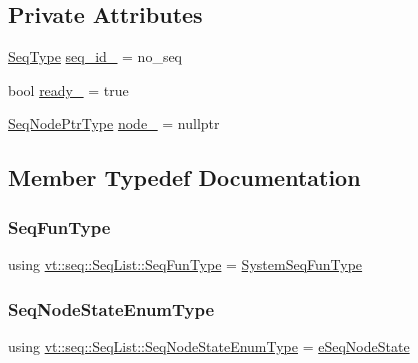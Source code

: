 \subsection*{Private Attributes}
\begin{DoxyCompactItemize}
\item 
\hyperlink{namespacevt_1_1seq_a3b612da217ac669d39c159f134ab8434}{Seq\+Type} \hyperlink{structvt_1_1seq_1_1_seq_list_abfbd1dc51e017e52745777f1c071b342}{seq\+\_\+id\+\_\+} = no\+\_\+seq
\item 
bool \hyperlink{structvt_1_1seq_1_1_seq_list_aeab1d1e13104f99fdf91eb57bc8f658a}{ready\+\_\+} = true
\item 
\hyperlink{namespacevt_1_1seq_ae6a4874b585be0612aaca32ca6d2d191}{Seq\+Node\+Ptr\+Type} \hyperlink{structvt_1_1seq_1_1_seq_list_afdf8a98af5cb6fbd49da10375a565a87}{node\+\_\+} = nullptr
\end{DoxyCompactItemize}


\subsection{Member Typedef Documentation}
\mbox{\label{structvt_1_1seq_1_1_seq_list_afa5aacad3530e543d1ea016acbfb1cbb}} 
\subsubsection{\texorpdfstring{Seq\+Fun\+Type}{SeqFunType}}
{\footnotesize\ttfamily using \hyperlink{structvt_1_1seq_1_1_seq_list_afa5aacad3530e543d1ea016acbfb1cbb}{vt\+::seq\+::\+Seq\+List\+::\+Seq\+Fun\+Type} =  \hyperlink{namespacevt_1_1seq_a80eeb50c74a4a3bd46fcf4d5213c5ebe}{System\+Seq\+Fun\+Type}}

\mbox{\label{structvt_1_1seq_1_1_seq_list_a0e985bbbf299669fbc45bc693b663d89}} 
\subsubsection{\texorpdfstring{Seq\+Node\+State\+Enum\+Type}{SeqNodeStateEnumType}}
{\footnotesize\ttfamily using \hyperlink{namespacevt_1_1seq_ad7b0496818667d816e00f717491d3b92}{vt\+::seq\+::\+Seq\+List\+::\+Seq\+Node\+State\+Enum\+Type} =  \hyperlink{namespacevt_1_1seq_ad7b0496818667d816e00f717491d3b92}{e\+Seq\+Node\+State}}

